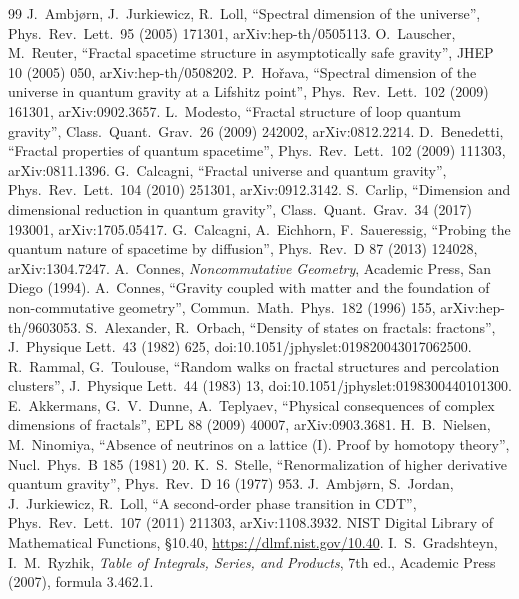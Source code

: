 \documentclass[11pt]{article}
\theoremstyle{remark}\newtheorem*{remark}{Remark}
\begin{document}
\begin{thebibliography}{99}
 J.~Ambj{\o}rn, J.~Jurkiewicz, R.~Loll, ``Spectral dimension of the universe'', Phys.\ Rev.\ Lett.\ 95 (2005) 171301, arXiv:hep-th/0505113.
 O.~Lauscher, M.~Reuter, ``Fractal spacetime structure in asymptotically safe gravity'', JHEP 10 (2005) 050, arXiv:hep-th/0508202.
 P.~Ho\v{r}ava, ``Spectral dimension of the universe in quantum gravity at a Lifshitz point'', Phys.\ Rev.\ Lett.\ 102 (2009) 161301, arXiv:0902.3657.
 L.~Modesto, ``Fractal structure of loop quantum gravity'', Class.\ Quant.\ Grav.\ 26 (2009) 242002, arXiv:0812.2214.
 D.~Benedetti, ``Fractal properties of quantum spacetime'', Phys.\ Rev.\ Lett.\ 102 (2009) 111303, arXiv:0811.1396.
 G.~Calcagni, ``Fractal universe and quantum gravity'', Phys.\ Rev.\ Lett.\ 104 (2010) 251301, arXiv:0912.3142.
 S.~Carlip, ``Dimension and dimensional reduction in quantum gravity'', Class.\ Quant.\ Grav.\ 34 (2017) 193001, arXiv:1705.05417.
 G.~Calcagni, A.~Eichhorn, F.~Saueressig, ``Probing the quantum nature of spacetime by diffusion'', Phys.\ Rev.\ D 87 (2013) 124028, arXiv:1304.7247.
 A.~Connes, \emph{Noncommutative Geometry}, Academic Press, San Diego (1994).
 A.~Connes, ``Gravity coupled with matter and the foundation of non-commutative geometry'', Commun.\ Math.\ Phys.\ 182 (1996) 155, arXiv:hep-th/9603053.
 S.~Alexander, R.~Orbach, ``Density of states on fractals: fractons'', J.\ Physique Lett.\ 43 (1982) 625, doi:10.1051/jphyslet:019820043017062500.
 R.~Rammal, G.~Toulouse, ``Random walks on fractal structures and percolation clusters'', J.\ Physique Lett.\ 44 (1983) 13, doi:10.1051/jphyslet:0198300440101300.
 E.~Akkermans, G.~V.~Dunne, A.~Teplyaev, ``Physical consequences of complex dimensions of fractals'', EPL 88 (2009) 40007, arXiv:0903.3681.
 H.~B.~Nielsen, M.~Ninomiya, ``Absence of neutrinos on a lattice (I). Proof by homotopy theory'', Nucl.\ Phys.\ B 185 (1981) 20.
 K.~S.~Stelle, ``Renormalization of higher derivative quantum gravity'', Phys.\ Rev.\ D 16 (1977) 953.
 J.~Ambj{\o}rn, S.~Jordan, J.~Jurkiewicz, R.~Loll, ``A second-order phase transition in CDT'', Phys.\ Rev.\ Lett.\ 107 (2011) 211303, arXiv:1108.3932.
 NIST Digital Library of Mathematical Functions, \S10.40, \url{https://dlmf.nist.gov/10.40}.
 I.~S.~Gradshteyn, I.~M.~Ryzhik, \emph{Table of Integrals, Series, and Products}, 7th ed., Academic Press (2007), formula 3.462.1.

\end{thebibliography}
\end{document}
